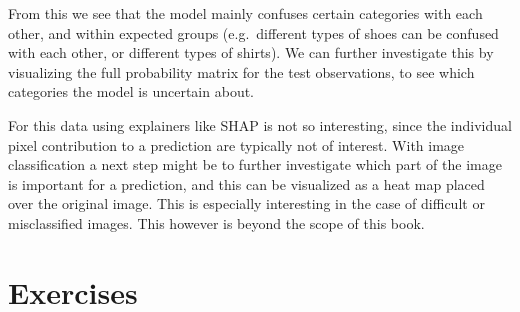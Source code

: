 \documentclass[
  letterpaper,
]{krantz}
\begin{document}
From this we see that the model mainly confuses certain categories with
each other, and within expected groups (e.g.~different types of shoes
can be confused with each other, or different types of shirts). We can
further investigate this by visualizing the full probability matrix for
the test observations, to see which categories the model is uncertain
about.

For this data using explainers like SHAP is not so interesting, since
the individual pixel contribution to a prediction are typically not of
interest. With image classification a next step might be to further
investigate which part of the image is important for a prediction, and
this can be visualized as a heat map placed over the original image.
This is especially interesting in the case of difficult or misclassified
images. This however is beyond the scope of this book.

\section*{Exercises}\label{exercises-16}

\end{document}

